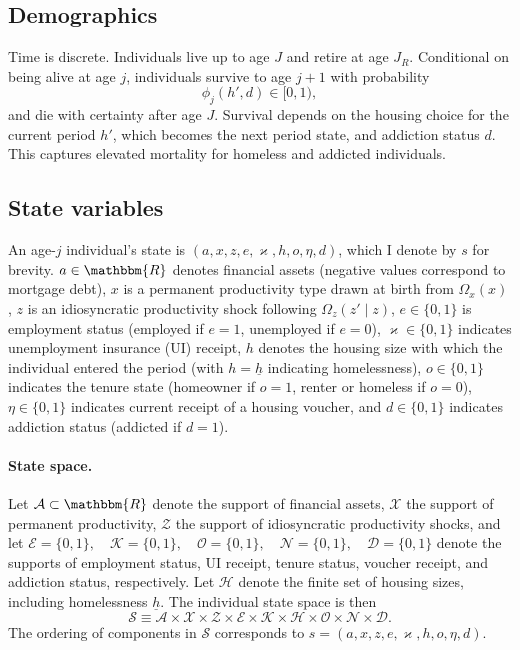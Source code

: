 \documentclass[parskip=full]{article}
\theoremstyle{plain}
\theoremstyle{definition}
\theoremstyle{remark}
\begin{document}
\subsection{Demographics}\label{sec:demographics}

Time is discrete. Individuals live up to age $J$ and retire at age $J_R$. Conditional on being alive at age $j$, individuals survive to age $j+1$ with probability
\begin{equation}\label{eq:survival}
\phi_j\left(h', d\right)\in [0,1),
\end{equation}
and die with certainty after age $J$. Survival depends on the housing choice for the current period $h'$, which becomes the next period state, and addiction status $d$. This captures elevated mortality for homeless and addicted individuals.

\subsection{State variables}\label{sec:states}

An age-$j$ individual’s state is $(a,x,z,e,\varkappa,h,o,\eta,d)$, which I denote by $s$ for brevity. $a\in\mathbbm{R}$ denotes financial assets (negative values correspond to mortgage debt), $x$ is a permanent productivity type drawn at birth from $\Omega_x(x)$, $z$ is an idiosyncratic productivity shock following $\Omega_z(z'\mid z)$, $e\in\{0,1\}$ is employment status (employed if $e=1$, unemployed if $e=0$), $\varkappa\in\{0,1\}$ indicates unemployment insurance (UI) receipt, $h$ denotes the housing size with which the individual entered the period (with $h=\underline h$ indicating homelessness), $o\in\{0,1\}$ indicates the tenure state (homeowner if $o=1$, renter or homeless if $o=0$), $\eta\in\{0,1\}$ indicates current receipt of a housing voucher, and $d\in\{0,1\}$ indicates addiction status (addicted if $d=1$).

\paragraph{State space.}
Let $\mathcal{A}\subset\mathbbm{R}$ denote the support of financial assets, $\mathcal{X}$ the support of permanent productivity, $\mathcal{Z}$ the support of idiosyncratic productivity shocks, and let $\mathcal{E}=\{0,1\},\quad \mathcal{K}=\{0,1\},\quad \mathcal{O}=\{0,1\},\quad \mathcal{N}=\{0,1\},\quad \mathcal{D}=\{0,1\}$ denote the supports of employment status, UI receipt, tenure status, voucher receipt, and addiction status, respectively. Let $\mathcal{H}$ denote the finite set of housing sizes, including homelessness $\underline h$. The individual state space is then
\[\mathcal{S}\equiv \mathcal{A}\times\mathcal{X}\times\mathcal{Z}\times\mathcal{E}\times\mathcal{K}\times\mathcal{H}\times\mathcal{O}\times\mathcal{N}\times\mathcal{D}.\] The ordering of components in $\mathcal{S}$ corresponds to
$s=(a,x,z,e,\varkappa,h,o,\eta,d)$.
\end{document}

